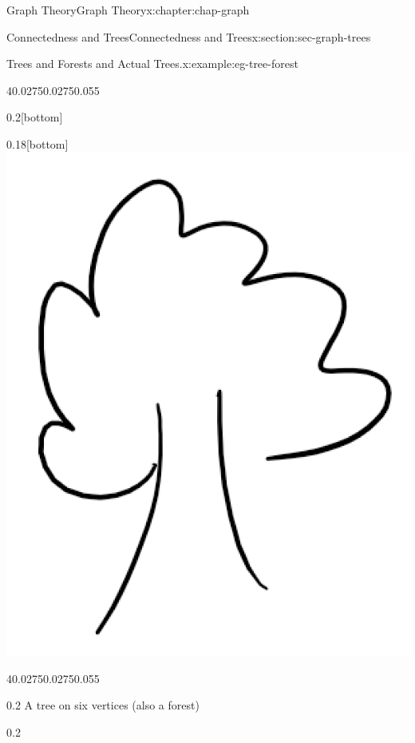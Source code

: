 \documentclass[oneside,10pt,]{book}
\numberwithin{equation}{section}
\begin{document}
\begin{chapterptx}{Graph Theory}{}{Graph Theory}{}{}{x:chapter:chap-graph}
\begin{sectionptx}{Connectedness and Trees}{}{Connectedness and Trees}{}{}{x:section:sec-graph-trees}
\begin{example}{Trees and Forests and Actual Trees.}{x:example:eg-tree-forest}
\begin{sidebyside}{4}{0.0275}{0.0275}{0.055}
\begin{sbspanel}{0.2}[bottom]
{
}%
\end{sbspanel}%
\begin{sbspanel}{0.18}[bottom]%
\includegraphics[width=\linewidth]{images/tree.png}
\end{sbspanel}%
\end{sidebyside}%
\begin{sidebyside}{4}{0.0275}{0.0275}{0.055}%
\begin{sbspanel}{0.2}%
A tree on six vertices (also a forest)%
\end{sbspanel}%
\begin{sbspanel}{0.2}%
\par

\end{sbspanel}
\end{sidebyside}
\end{example}
\end{sectionptx}
\end{chapterptx}
\end{document}
